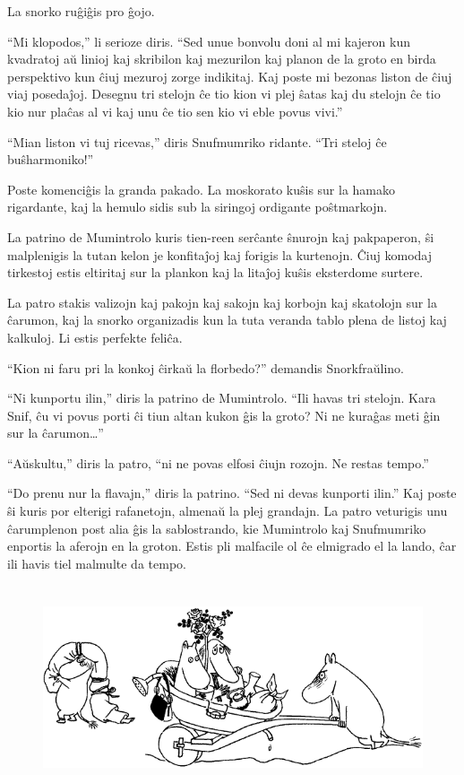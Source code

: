 La snorko ruĝiĝis pro ĝojo.

``Mi klopodos,'' li serioze diris. ``Sed unue bonvolu doni al mi kajeron kun kvadratoj aŭ linioj kaj skribilon kaj mezurilon kaj planon de la groto en birda perspektivo kun ĉiuj mezuroj zorge indikitaj. Kaj poste mi bezonas liston de ĉiuj viaj posedaĵoj. Desegnu tri stelojn ĉe tio kion vi plej ŝatas kaj du stelojn ĉe tio kio nur plaĉas al vi kaj unu ĉe tio sen kio vi eble povus vivi.''

``Mian liston vi tuj ricevas,'' diris Snufmumriko ridante. ``Tri steloj ĉe buŝharmoniko!''

\sectionbreak

Poste komenciĝis la granda pakado. La moskorato kuŝis sur la hamako rigardante, kaj la hemulo sidis sub la siringoj ordigante poŝtmarkojn.

La patrino de Mumintrolo kuris tien-reen serĉante ŝnurojn kaj pakpaperon, ŝi malplenigis la tutan kelon je konfitaĵoj kaj forigis la kurtenojn. Ĉiuj komodaj tirkestoj estis eltiritaj sur la plankon kaj la litaĵoj kuŝis eksterdome surtere.

La patro stakis valizojn kaj pakojn kaj sakojn kaj korbojn kaj skatolojn sur la ĉarumon, kaj la snorko organizadis kun la tuta veranda tablo plena de listoj kaj kalkuloj. Li estis perfekte feliĉa.

``Kion ni faru pri la konkoj ĉirkaŭ la florbedo?'' demandis Snorkfraŭlino.

``Ni kunportu ilin,'' diris la patrino de Mumintrolo. ``Ili havas tri stelojn. Kara Snif, ĉu vi povus porti ĉi tiun altan kukon ĝis la groto? Ni ne kuraĝas meti ĝin sur la ĉarumon{\ldots}''

``Aŭskultu,'' diris la patro, ``ni ne povas elfosi ĉiujn rozojn. Ne restas tempo.''

``Do prenu nur la flavajn,'' diris la patrino. ``Sed ni devas kunporti ilin.'' Kaj poste ŝi kuris por elterigi rafanetojn, almenaŭ la plej grandajn. La patro veturigis unu ĉarumplenon post alia ĝis la sablostrando, kie Mumintrolo kaj Snufmumriko enportis la aferojn en la groton. Estis pli malfacile ol ĉe elmigrado el la lando, ĉar ili havis tiel malmulte da tempo.

\begin{figure}[htbp]
\centering
\includegraphics[width=400pt,height=170pt]{9-4.png}
\caption{}
\label{9-4}
\end{figure}

